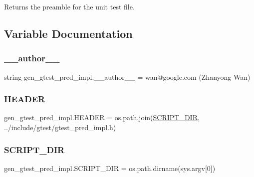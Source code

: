\begin{DoxyVerb}Returns the preamble for the unit test file.\end{DoxyVerb}
 

\subsection{Variable Documentation}
\mbox{\label{namespacegen__gtest__pred__impl_af32e92d473ee6c427929cb7ddb4db7e6}} 
\subsubsection{\texorpdfstring{\_\_author\_\_}{\_\_author\_\_}}
{\footnotesize\ttfamily string gen\+\_\+gtest\+\_\+pred\+\_\+impl.\+\_\+\+\_\+author\+\_\+\+\_\+ = \textquotesingle{}wan@google.\+com (Zhanyong Wan)\textquotesingle{}\hspace{0.3cm}{\ttfamily [private]}}

\mbox{\label{namespacegen__gtest__pred__impl_ab96c63705e2cb7619876ba592dab4c8e}} 
\subsubsection{\texorpdfstring{HEADER}{HEADER}}
{\footnotesize\ttfamily gen\+\_\+gtest\+\_\+pred\+\_\+impl.\+H\+E\+A\+D\+ER = os.\+path.\+join(\mbox{\hyperlink{namespacegen__gtest__pred__impl_aed087c7fc787a064f0a9fd5f5f9f6487}{S\+C\+R\+I\+P\+T\+\_\+\+D\+IR}}, \textquotesingle{}../include/gtest/gtest\+\_\+pred\+\_\+impl.\+h\textquotesingle{})}

\mbox{\label{namespacegen__gtest__pred__impl_aed087c7fc787a064f0a9fd5f5f9f6487}} 
\subsubsection{\texorpdfstring{SCRIPT\_DIR}{SCRIPT\_DIR}}
{\footnotesize\ttfamily gen\+\_\+gtest\+\_\+pred\+\_\+impl.\+S\+C\+R\+I\+P\+T\+\_\+\+D\+IR = os.\+path.\+dirname(sys.\+argv\mbox{[}0\mbox{]})}

